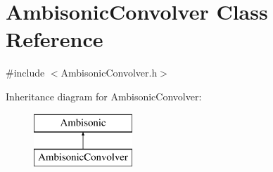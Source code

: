 \hypertarget{class_ambisonic_convolver}{\section{Ambisonic\-Convolver Class Reference}
\label{class_ambisonic_convolver}
}


{\ttfamily \#include $<$Ambisonic\-Convolver.\-h$>$}

Inheritance diagram for Ambisonic\-Convolver\-:\begin{figure}[H]
\begin{center}
\leavevmode
\includegraphics[height=2.000000cm]{class_ambisonic_convolver}
\end{center}
\end{figure}

